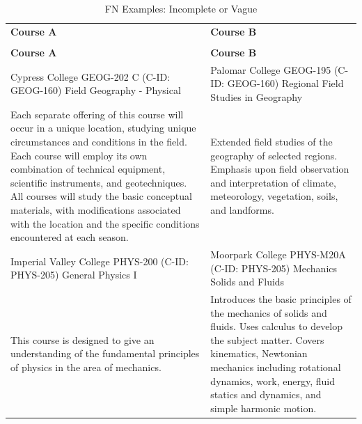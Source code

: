 {
\renewcommand{\arraystretch}{0.5}    
\begin{longtable}{ >{\baselineskip=12pt}p{}  >{\baselineskip=12pt}p{} }
\captionsetup{skip=5pt}
\caption{FN Examples: Incomplete or Vague}\label{tab:fn_incomplete}\\
\bottomrule\toprule
\textbf{Course A} & \textbf{Course B} \\
\bottomrule\toprule
\endfirsthead
\caption[]{FN Examples: Incomplete or Vague}\\
\bottomrule\toprule
\textbf{Course A} & \textbf{Course B} \\
\bottomrule\toprule
\endhead
Cypress College \newline GEOG-202 C (C-ID: GEOG-160) \newline Field Geography - Physical & Palomar College \newline GEOG-195 (C-ID: GEOG-160) \newline Regional Field Studies in Geography \\
\midrule
Each separate offering of this course will occur in a unique location, studying unique circumstances and conditions in the field. Each course will employ its own combination of technical equipment, scientific instruments, and geotechniques. All courses will study the basic conceptual materials, with modifications associated with the location and the specific conditions encountered at each season. & Extended field studies of the geography of selected regions. Emphasis upon field observation and interpretation of climate, meteorology, vegetation, soils, and landforms. \\
\bottomrule\toprule
Imperial Valley College \newline PHYS-200 (C-ID: PHYS-205) \newline General Physics I & Moorpark College \newline PHYS-M20A (C-ID: PHYS-205) \newline Mechanics Solids and Fluids \\
\midrule
This course is designed to give an understanding of the fundamental principles of physics in the area of mechanics. & Introduces the basic principles of the mechanics of solids and fluids. Uses calculus to develop the subject matter. Covers kinematics, Newtonian mechanics including rotational dynamics, work, energy, fluid statics and dynamics, and simple harmonic motion. \\
\bottomrule\toprule
\end{longtable}
}

